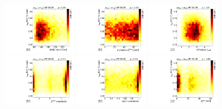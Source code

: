\begin{figure}[tp]
  \centering
  \includegraphics[width=0.32\textwidth]{figures/tauidcorrelations/tauid_vs_mMMC}
  \includegraphics[width=0.32\textwidth]{figures/tauidcorrelations/tauid_vs_mT}
  \includegraphics[width=0.32\textwidth]{figures/tauidcorrelations/tauid_vs_dR}
  \includegraphics[width=0.32\textwidth]{figures/tauidcorrelations/tauid_vs_metphi}
  \includegraphics[width=0.32\textwidth]{figures/tauidcorrelations/tauid_vs_lepeta}
  \includegraphics[width=0.32\textwidth]{figures/tauidcorrelations/tauid_vs_pttot}

\end{figure}
